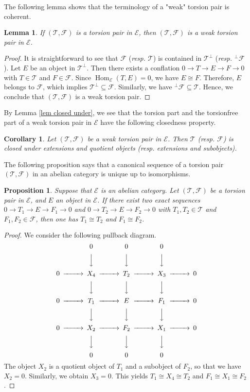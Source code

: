 \documentclass{amsart}
\newtheorem{cor}[thm]{Corollary}
\newtheorem{lem}[thm]{Lemma}
\newtheorem{prop}[thm]{Proposition}
\theoremstyle{definition}
\theoremstyle{remark}
\def\E{\mathcal{E}}
\def\F{\mathcal{F}}
\def\Hom{\operatorname{Hom}}
\def\T{\mathcal{T}}
\begin{document}
The following lemma shows that the terminology of a "weak" torsion pair is coherent.

\begin{lem}
If $(\T,\F)$ is a torsion pair in $\E$, then $(\T,\F)$ is a weak torsion pair in $\E$.
\end{lem}

\begin{proof}
It is straightforward to see that $\F$ (\emph{resp. $\T$}) is contained in $\T^\perp$ (\emph{resp. ${}^\perp\F$}). 
Let $E$ be an object in $\T^\perp$. Then there exists a conflation $0\to T\to E\to F\to0$ with $T\in \T$ and $F\in \F$. Since $\Hom_\E(T,E)=0$, we have $E\cong F$. Therefore, $E$ belongs to $\F$, which implies $\T^\perp\subseteq\F$. Similarly, we have $^\perp\F\subseteq\T$. Hence, we conclude that $(\T,\F)$ is a weak torsion pair.
\end{proof}

By Lemma \ref{lem closed under}, we see that the torsion part and the torsionfree part of a weak torsion pair in $\E$ have the following closedness property.

\begin{cor}
Let $(\T,\F)$ be a weak torsion pair in $\E$. Then $\T$ \emph{(resp. $\F$)} is closed under extensions and quotient objects \emph{(resp.} extensions and subobjects\emph{)}.
\end{cor}

The following proposition says that a canonical sequence of a torsion pair $(\T,\F)$ in an abelian category is unique up to isomorphisms.

\begin{prop}
Suppose that $\E$ is an abelian category. Let $(\T,\F)$ be a torsion pair in $\E$, and $E$ an object in $\E$. If there exist two exact sequences $0\to T_1\to E\to F_1\to 0$ and $0\to T_2\to E\to F_2\to 0$ with $T_1,T_2\in \T$ and $F_1,F_2\in \F$, then one has $T_1\cong T_2$ and $F_1\cong F_2$.
\end{prop}

\begin{proof}
We consider the following pullback diagram.
$$
\begin{CD}
 @. 0 @. 0 @. 0 @.\\
@. @VVV @VVV @VVV @.\\
0 @>>> X_4 @>>> T_2 @>>> X_3 @>>> 0\\
@. @VVV @VVV @VVV @.\\
0 @>>> T_1 @>>> E @>>> F_1 @>>> 0\\
@. @VVV @VVV @VVV @.\\
0 @>>> X_2 @>>> F_2 @>>> X_1 @>>> 0\\
@. @VVV @VVV @VVV @.\\
 @. 0 @. 0 @. 0 @.
\end{CD}
$$
The object $X_2$ is a quotient object of $T_1$ and a subobject of $F_2$, so that we have $X_2=0$. Similarly, we obtain $X_3=0$. This yields $T_1\cong X_4 \cong T_2$ and $F_1\cong X_1\cong F_2$.
\end{proof}
\end{document}
